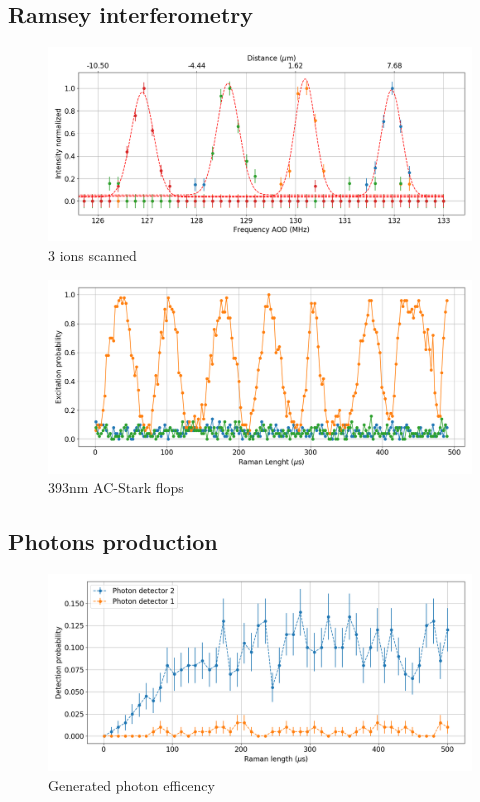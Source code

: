 \documentclass[english, a4paper, 12pt, twoside]{article}
\numberwithin{equation}{section} %
\begin{document}
\subsection{Ramsey interferometry}
\begin{figure}[H]
\centering
\includegraphics[width=\textwidth]{img/AODscan}
\caption{3 ions scanned}
\end{figure}
\begin{figure}[H]
\centering
\includegraphics[width=\textwidth]{img/ac_stark}
\caption{393nm AC-Stark flops}
\end{figure}

\subsection{Photons production}
\begin{figure}[H]
\centering
\includegraphics[width=\textwidth]{img/photonefficency_witherror}
\caption{Generated photon efficency}
\end{figure}
\end{document}
